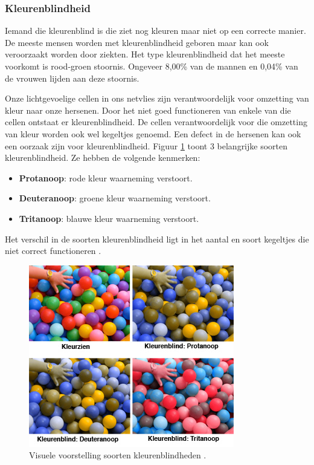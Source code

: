 \subsubsection{Kleurenblindheid}
Iemand die kleurenblind is die ziet nog kleuren maar niet op een correcte manier. De meeste mensen worden met kleurenblindheid geboren maar kan ook veroorzaakt worden door ziekten. 
Het type kleurenblindheid dat het meeste voorkomt is rood-groen stoornis.  Ongeveer 8,00\% van de mannen en 0,04\% van de vrouwen lijden aan deze stoornis. 

Onze lichtgevoelige cellen in ons netvlies zijn verantwoordelijk voor omzetting van kleur naar onze hersenen. Door het niet goed functioneren van enkele van die cellen ontstaat er kleurenblindheid. De cellen verantwoordelijk voor die omzetting van kleur worden ook wel kegeltjes genoemd. Een defect in de hersenen kan ook een oorzaak zijn voor kleurenblindheid. Figuur \ref{fig:ballenbak} toont 3 belangrijke soorten kleurenblindheid. Ze hebben de volgende kenmerken: 
\begin{itemize}
    \item \textbf{Protanoop}: rode kleur waarneming verstoort.
    \item \textbf{Deuteranoop}: groene kleur waarneming verstoort.
    \item \textbf{Tritanoop}: blauwe kleur waarneming verstoort.
\end{itemize}
Het verschil in de soorten kleurenblindheid ligt in het aantal en soort kegeltjes die niet correct functioneren \autocite{visioKleur2019}.



\begin{figure}[!h]
    \centering
    \includegraphics[width=0.5\linewidth]{img/ballenbak}
    \caption{Visuele voorstelling soorten kleurenblindheden \autocite{visioKleur2019}.}
    \label{fig:ballenbak}
\end{figure}



